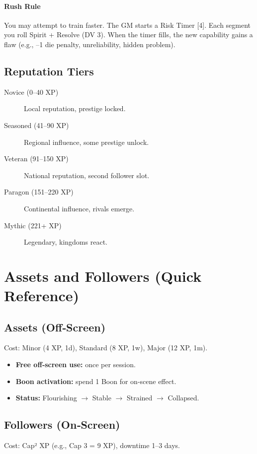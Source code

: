 \paragraph{Rush Rule}
You may attempt to train faster. The GM starts a Risk Timer [4]. Each segment
you roll Spirit + Resolve (DV 3). When the timer fills, the new capability gains
a flaw (e.g., --1 die penalty, unreliability, hidden problem).

\subsection{Reputation Tiers}
\begin{description}
    \item[Novice (0--40 XP)] Local reputation, prestige locked.
    \item[Seasoned (41--90 XP)] Regional influence, some prestige unlock.
    \item[Veteran (91--150 XP)] National reputation, second follower slot.
    \item[Paragon (151--220 XP)] Continental influence, rivals emerge.
    \item[Mythic (221+ XP)] Legendary, kingdoms react.
\end{description}

\section{Assets and Followers (Quick Reference)}\label{sec:assets_followers}

\subsection{Assets (Off‑Screen)}
Cost: Minor (4 XP, 1d), Standard (8 XP, 1w), Major (12 XP, 1m).

\begin{itemize}
    \item \textbf{Free off‑screen use:} once per session.
    \item \textbf{Boon activation:} spend 1 Boon for on‑scene effect.
    \item \textbf{Status:} Flourishing $\rightarrow$ Stable $\rightarrow$ Strained $\rightarrow$ Collapsed.
\end{itemize}

\subsection{Followers (On‑Screen)}
Cost: Cap² XP (e.g., Cap 3 = 9 XP), downtime 1--3 days.

